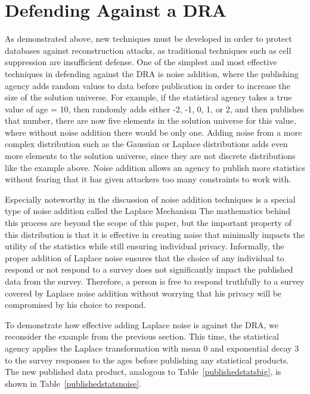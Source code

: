 \documentclass[5p,times,11pt]{elsarticle}
\begin{document}
\section{Defending Against a DRA}
As demonstrated above, new techniques must be developed in
order to protect databases against reconstruction attacks, as traditional techniques such as cell suppression are insufficient defense. One of the simplest and most effective techniques in defending against the DRA is noise addition, where the publishing agency adds random values to data before publication in order to increase the size of the solution universe. For example, if the statistical agency takes a true value of age = 10, then randomly adds either -2, -1, 0, 1, or 2, and then publishes that number, there are now five elements in the solution universe for this value, where without noise addition there would be only one. Adding noise from a more complex distribution such as the Gaussian or Laplace distributions adds even more elements to the solution universe, since they are not discrete distributions like the example above. Noise addition allows an agency to publish more statistics without fearing that it has given attackers too many constraints to work with.

Especially noteworthy in the discussion of noise addition techniques is a special type of noise addition called the Laplace Mechanism \cite{Dwork:2006:CNS:2180286.2180305}
The mathematics behind this process are beyond the scope of this paper, but the important property of this distribution is that it is effective in creating noise that minimally impacts the utility of the statistics while still ensuring individual privacy. Informally, the proper addition of Laplace noise ensures that the choice of any individual to respond or not respond to a survey does not significantly impact the published data from the survey. Therefore, a person is free to respond truthfully to a survey covered by Laplace noise addition without worrying that his privacy will be compromised by his choice to respond.

To demonstrate how effective adding Laplace noise is against the DRA, we reconsider the example from the previous section. This time, the statistical agency applies the Laplace transformation with mean 0 and exponential decay 3 to the survey responses to the ages before publishing any statistical products. The new published data product, analogous to Table~\ref{publishedstatsbig}, is shown in Table~\ref{publishedstatsnoise}.
\end{document}
